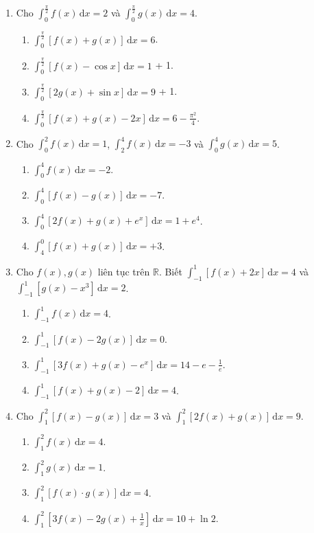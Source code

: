 \documentclass[12pt]{article}
\begin{document}
\begin{enumerate}[label=\textbf{Câu \arabic*.}]
		\item Cho $\displaystyle \int_0^{\frac{\pi}{2}} f(x)\,\mathrm{d}x = 2$ và $\displaystyle \int_0^{\frac{\pi}{2}} g(x)\,\mathrm{d}x = 4$.
		\begin{enumerate}[label=\alph*)]			\item $\displaystyle \int_0^{\frac{\pi}{2}} [f(x) + g(x)]\,\mathrm{d}x = 6$.
			\item $\displaystyle \int_0^{\frac{\pi}{2}} [f(x) - \cos x]\,\mathrm{d}x = 1$ + 1.
			\item $\displaystyle \int_0^{\frac{\pi}{2}} [2g(x) + \sin x]\,\mathrm{d}x = 9$ + 1.
			\item $\displaystyle \int_0^{\frac{\pi}{2}} [f(x) + g(x) - 2x]\,\mathrm{d}x = 6 - \frac{\pi^2}{4}$.
\end{enumerate}
		
		\item Cho $\displaystyle \int_0^2 f(x)\,\mathrm{d}x = 1$, $\displaystyle \int_2^4 f(x)\,\mathrm{d}x = -3$ và $\displaystyle \int_0^4 g(x)\,\mathrm{d}x = 5$.
		\begin{enumerate}[label=\alph*)]			\item $\displaystyle \int_0^4 f(x)\,\mathrm{d}x = -2$.
			\item $\displaystyle \int_0^4 [f(x) - g(x)]\,\mathrm{d}x = -7$.
			\item $\displaystyle \int_0^4 [2f(x) + g(x) + e^x]\,\mathrm{d}x = 1 + e^4$.
			\item $\displaystyle \int_4^0 [f(x) + g(x)]\,\mathrm{d}x = +3$.
\end{enumerate}
		
		\item Cho $f(x), g(x)$ liên tục trên $\mathbb{R}$. Biết $\displaystyle \int_{-1}^1 [f(x) + 2x]\,\mathrm{d}x = 4$ và $\displaystyle \int_{-1}^1 [g(x) - x^3]\,\mathrm{d}x = 2$.
		\begin{enumerate}[label=\alph*)]			\item $\displaystyle \int_{-1}^1 f(x)\,\mathrm{d}x = 4$.
			\item $\displaystyle \int_{-1}^1 [f(x) - 2g(x)]\,\mathrm{d}x = 0$.
			\item $\displaystyle \int_{-1}^1 [3f(x) + g(x) - e^x]\,\mathrm{d}x = 14 - e - \frac{1}{e}$.
			\item $\displaystyle \int_{-1}^1 [f(x) + g(x) - 2]\,\mathrm{d}x = 4$.
\end{enumerate}
		
		\item Cho $\displaystyle \int_1^2 [f(x) - g(x)]\,\mathrm{d}x = 3$ và $\displaystyle \int_1^2 [2f(x) + g(x)]\,\mathrm{d}x = 9$.
		\begin{enumerate}[label=\alph*)]			\item $\displaystyle \int_1^2 f(x)\,\mathrm{d}x = 4$.
			\item $\displaystyle \int_1^2 g(x)\,\mathrm{d}x = 1$.
			\item $\displaystyle \int_1^2 [f(x) \cdot g(x)]\,\mathrm{d}x = 4$.
			\item $\displaystyle \int_1^2 \left[3f(x) - 2g(x) + \frac{1}{x}\right]\,\mathrm{d}x = 10 + \ln 2$.
\end{enumerate}
		

\end{enumerate}
\end{document}
